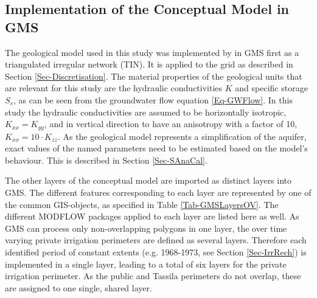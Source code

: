 
\subsection{Implementation of the Conceptual Model in GMS}
\label{Sec-ImplToGMS}

The geological model used in this study was implemented by \textcite{Horn.2021} in GMS first as a triangulated irregular network (TIN). 
It is applied to the grid as described in Section \ref{Sec-Discretisation}. 
The material properties of the geological units that are relevant for this study are the hydraulic conductivities $K$ and specific storage $S_s$, as can be seen from the groundwater flow equation \eqref{Eq-GWFlow}. 
In this study the hydraulic conductivities are assumed to be horizontally isotropic, $K_{xx} = K_{yy}$, and in vertical direction to have an anisotropy with a factor of 10, $K_{xx} = 10 \cdot K_{zz}$. 
As the geological model represents a simplification of the aquifer, exact values of the named parameters need to be estimated based on the model's behaviour. 
This is described in Section \ref{Sec-SAnaCal}.

The other layers of the conceptual model are imported as distinct layers into GMS. 
The different features corresponding to each layer are represented by one of the common GIS-objects, as specified in Table \ref{Tab-GMSLayersOV}. 
The different MODFLOW packages applied to each layer are listed here as well. 
As GMS can process only non-overlapping polygons in one layer, the over time varying private irrigation perimeters are defined as several layers. 
Therefore each identified period of constant extents (e.g. 1968-1973, see Section \ref{Sec-IrrRech}) is implemented in a single layer, leading to a total of six layers for the private irrigation perimeter. 
As the public and Tassila perimeters do not overlap, these are assigned to one single, shared layer.

